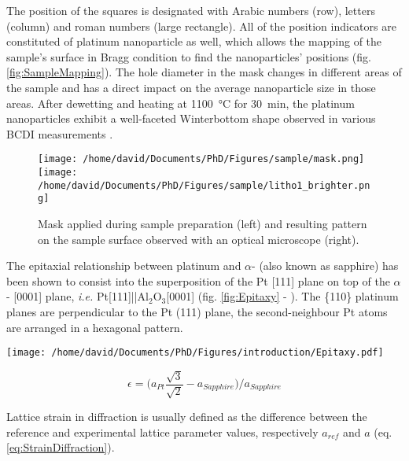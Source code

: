 The position of the squares is designated with Arabic numbers (row), letters (column) and roman numbers (large rectangle).
All of the position indicators are constituted of platinum nanoparticle as well, which allows the mapping of the sample's surface in Bragg condition to find the nanoparticles' positions (fig. \ref{fig:SampleMapping}).
The hole diameter in the mask changes in different areas of the sample and has a direct impact on the average nanoparticle size in those areas.
After dewetting and heating at \qty{1100}{\degreeCelsius} for \qty{30}{\minute}, the platinum nanoparticles exhibit a well-faceted Winterbottom shape observed in various BCDI measurements \parencite{Dupraz2017}.

\begin{figure}[!htb]
    \centering
    \texttt{[image: /home/david/Documents/PhD/Figures/sample/mask.png]}
    \texttt{[image: /home/david/Documents/PhD/Figures/sample/litho1\_brighter.png]}
    \caption{
        Mask applied during sample preparation (left) and resulting pattern on the sample surface observed with an optical microscope (right).
    }
    \label{fig:Mask}
\end{figure}

The epitaxial relationship between platinum and $\alpha$- (also known as sapphire) has been shown to consist into the superposition of the Pt [111] plane on top of the $\alpha$- [0001] plane, \textit{i.e.} Pt[111]||Al$_2$O$_3$[0001] (fig. \ref{fig:Epitaxy} - \cite{Farrow1993}).
The \{110\} platinum planes are perpendicular to the Pt (111) plane, the second-neighbour Pt atoms are arranged in a hexagonal pattern.

\begin{minipage}{0.55\linewidth}
    \centering
    \texttt{[image: /home/david/Documents/PhD/Figures/introduction/Epitaxy.pdf]}
    \label{fig:Epitaxy}
\end{minipage}%
\hfill%
\begin{minipage}{0.44\linewidth}
    \begin{equation}
        \epsilon = \big( a_{Pt} \frac{\sqrt{3}}{\sqrt{2}} - a_{Sapphire} \big) / a_{Sapphire}
        \label{eq:MisfitStrain}
    \end{equation}
\end{minipage}%

Lattice strain in diffraction is usually defined as the difference between the reference and experimental lattice parameter values, respectively $a_{ref}$ and $a$ (eq. \ref{eq:StrainDiffraction}).

